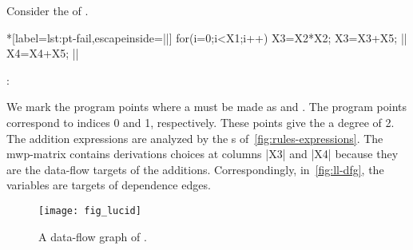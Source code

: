 \begin{example}\label{ex:mat}
Consider the  of \explain.

\begin{center}
\begin{minipage}{\linewidth}
\begin{minipage}{.28\linewidth}
\begin{implisting}*[label={lst:pt-fail},escapeinside=||]
for(i=0;i<X1;i++)
{ X3=X2*X2;
  X3=X3+X5; ||
  X4=X4+X5; || }
\end{implisting}
\end{minipage}%
\hfill : \hfill%
\end{minipage}
\end{center}

We mark the program points where a  must be made as
 and . The program points correspond to indices 0 and 1,
respectively. These points give the  a degree of 2. The addition
expressions are analyzed by the s
of~\autoref{fig:rules-expressions}. The mwp-matrix contains derivations choices
at columns \pr|X3| and \pr|X4| because they are the data-flow targets of the
additions. Correspondingly, in~\autoref{fig:ll-dfg}, the variables are targets
of dependence edges.

\begin{figure}[H]
\centering
\texttt{[image: fig\_lucid]}
\caption[A data-flow graph of \exname]{A data-flow graph of \exname.}
\label{fig:ll-dfg}
\end{figure}


\end{example}
